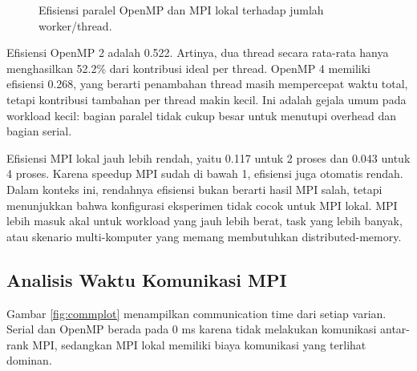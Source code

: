 \documentclass[conference]{IEEEtran}
\begin{document}
\begin{figure}[!t]
\centering
{}
\caption{Efisiensi paralel OpenMP dan MPI lokal terhadap jumlah worker/thread.}
\label{fig:efficiencyplot}
\end{figure}

Efisiensi OpenMP 2 adalah 0.522. Artinya, dua thread secara rata-rata hanya menghasilkan 52.2\% dari kontribusi ideal per thread. OpenMP 4 memiliki efisiensi 0.268, yang berarti penambahan thread masih mempercepat waktu total, tetapi kontribusi tambahan per thread makin kecil. Ini adalah gejala umum pada workload kecil: bagian paralel tidak cukup besar untuk menutupi overhead dan bagian serial.

Efisiensi MPI lokal jauh lebih rendah, yaitu 0.117 untuk 2 proses dan 0.043 untuk 4 proses. Karena speedup MPI sudah di bawah 1, efisiensi juga otomatis rendah. Dalam konteks ini, rendahnya efisiensi bukan berarti hasil MPI salah, tetapi menunjukkan bahwa konfigurasi eksperimen tidak cocok untuk MPI lokal. MPI lebih masuk akal untuk workload yang jauh lebih berat, task yang lebih banyak, atau skenario multi-komputer yang memang membutuhkan distributed-memory.

\subsection{Analisis Waktu Komunikasi MPI}

Gambar \ref{fig:commplot} menampilkan communication time dari setiap varian. Serial dan OpenMP berada pada 0 ms karena tidak melakukan komunikasi antar-rank MPI, sedangkan MPI lokal memiliki biaya komunikasi yang terlihat dominan.
\end{document}
